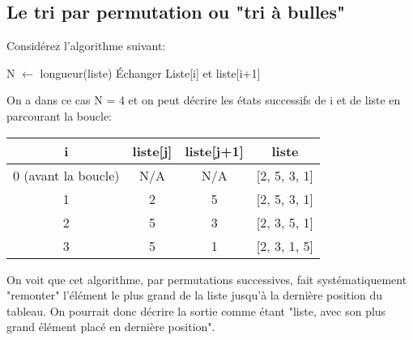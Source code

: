 \documentclass[12pt]{article}
\begin{document}
	\subsection{Le tri par permutation ou "tri à bulles"}
	Considérez l'algorithme suivant:
	\begin{algorithmic}[1]
		\State N $\leftarrow$ longueur(liste)
		\State Échanger Liste[i] et liste[i+1]
		\EndIf
		\EndFor
		\State{}
		\EndFunction
	\end{algorithmic}
	
	\begin{MaReponse}
		On a dans ce cas N = 4 et on peut décrire les états successifs de i et de liste en parcourant la boucle:
		\begin{center}
			\begin{tabular}{|c|c|c|c|}
				\hline
				\textbf{i}&\textbf{liste[j]}&\textbf{liste[j+1]}&\textbf{liste}\\
				\hline
				0 (avant la boucle)&N/A&N/A&[2, 5, 3, 1]\\
				\hline
				1&2&5&[2, 5, 3, 1]\\
				\hline
				2&5&3&[2, 3, 5, 1]\\
				\hline
				3&5&1&[2, 3, 1, 5]\\
				\hline
			\end{tabular}
		\end{center}
	\end{MaReponse}
		
	\begin{MaReponse}
		On voit que cet algorithme, par permutations successives, fait systématiquement "remonter" l'élément le plus grand de la liste jusqu'à la dernière position du tableau. On pourrait donc décrire la sortie comme étant "liste, avec son plus grand élément placé en dernière position".
	\end{MaReponse}
	
\end{document}
